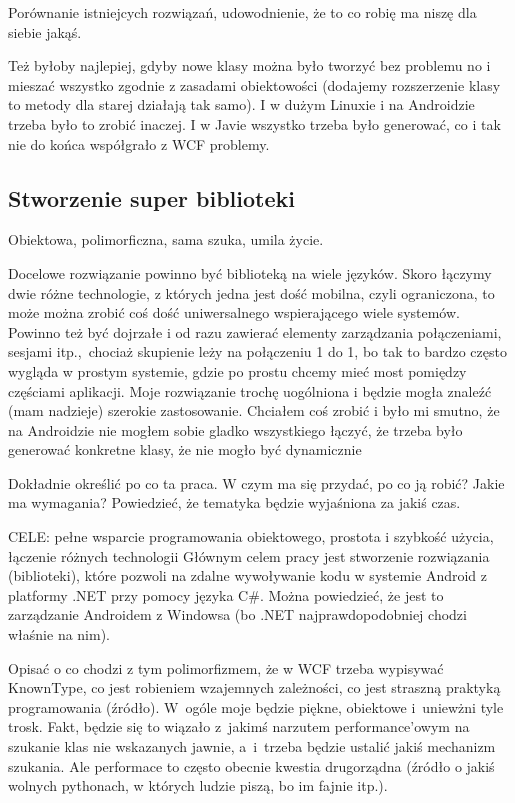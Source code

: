 Porównanie istniejcych rozwiązań, udowodnienie, że to co robię ma niszę dla siebie jakąś.

Też byłoby najlepiej, gdyby nowe klasy można było tworzyć bez problemu no i mieszać wszystko zgodnie z zasadami obiektowości (dodajemy rozszerzenie klasy to metody dla starej działają tak samo). I w dużym Linuxie i na Androidzie trzeba było to zrobić inaczej. I w Javie wszystko trzeba było generować, co i tak nie do końca współgrało z WCF problemy.

\subsection{Stworzenie super biblioteki}
Obiektowa, polimorficzna, sama szuka, umila życie.

Docelowe rozwiązanie powinno być biblioteką na wiele języków. Skoro łączymy dwie różne technologie, z których jedna jest dość mobilna, czyli ograniczona, to może można zrobić coś dość uniwersalnego wspierającego wiele systemów. Powinno też być dojrzałe i od razu zawierać elementy zarządzania połączeniami, sesjami itp.,~chociaż skupienie leży na połączeniu 1 do 1, bo tak to bardzo często wygląda w prostym systemie, gdzie po prostu chcemy mieć most pomiędzy częściami aplikacji. Moje rozwiązanie trochę uogólniona i będzie mogła znaleźć (mam nadzieje) szerokie zastosowanie. Chciałem coś zrobić i było mi smutno, że na Androidzie nie mogłem sobie gladko wszystkiego łączyć, że trzeba było generować konkretne klasy, że nie mogło być dynamicznie

Dokładnie określić po co ta praca. W czym ma się przydać, po co ją robić? Jakie ma wymagania?
Powiedzieć, że tematyka będzie wyjaśniona za jakiś czas.

CELE: pełne wsparcie programowania obiektowego, prostota i szybkość użycia, łączenie różnych technologii
Głównym celem pracy jest stworzenie rozwiązania (biblioteki), które pozwoli na zdalne wywoływanie kodu w systemie Android z platformy .NET przy pomocy języka C\#. Można powiedzieć, że jest to zarządzanie Androidem z Windowsa (bo .NET najprawdopodobniej chodzi właśnie na nim).

Opisać o co chodzi z tym polimorfizmem, że w WCF trzeba wypisywać KnownType, co jest robieniem wzajemnych zależności, co jest straszną praktyką programowania (źródło). W~ogóle moje będzie piękne, obiektowe i~uniewżni tyle trosk. Fakt, będzie się to wiązało z~jakimś narzutem performance'owym na szukanie klas nie wskazanych jawnie, a~i~trzeba będzie ustalić jakiś mechanizm szukania. Ale performace to często obecnie kwestia drugorządna (źródło o jakiś wolnych pythonach, w których ludzie piszą, bo im fajnie itp.).

